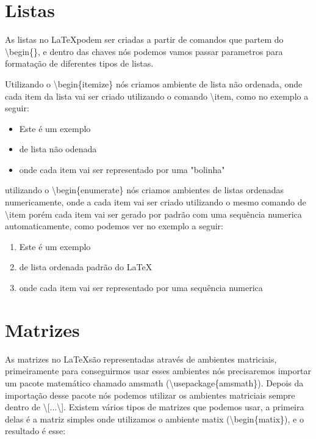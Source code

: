 \section{Listas}

As listas no \LaTeX podem ser criadas a partir de comandos que partem do \textbackslash begin\{\}, e dentro das chaves nós podemos vamos passar parametros para formatação de diferentes tipos de listas.

Utilizando o \textbackslash begin\{itemize\} nós criamos ambiente de lista não ordenada, onde cada item da lista vai ser criado utilizando o comando \textbackslash item, como no exemplo a seguir:

\begin{itemize}
    \item Este é um exemplo
    \item de lista não odenada
    \item onde cada item vai ser representado por uma "bolinha"
\end{itemize}

utilizando o \textbackslash begin\{enumerate\} nós criamos ambientes de listas ordenadas numericamente, onde a cada item vai ser criado utilizando o mesmo comando de \textbackslash item porém cada item vai ser gerado por padrão com uma sequência numerica automaticamente, como podemos ver no exemplo a seguir:

\begin{enumerate}
    \item Este é um exemplo
    \item de lista ordenada padrão do \LaTeX
    \item onde cada item vai ser representado por uma sequência numerica
\end{enumerate}

\section{Matrizes}
As matrizes no \LaTeX são representadas através de ambientes matriciais, primeiramente para conseguirmos usar esses ambientes nós precisaremos importar um pacote matemático chamado amsmath (\textbackslash usepackage\{amsmath\}). Depois da importação desse pacote nós podemos utilizar os ambientes matriciais sempre dentro de \textbackslash[...\textbackslash]. Existem vários tipos de matrizes que podemos usar, a primeira delas é a matriz simples onde utilizamos o ambiente matix (\textbackslash begin\{matix\}), e o resultado é esse:

